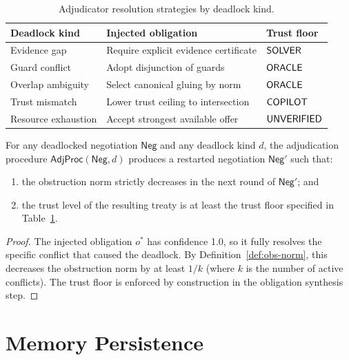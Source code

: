\documentclass[11pt]{article}
\newcommand{\Neg}{\mathsf{Neg}}           %
\newcommand{\AdjProc}{\mathsf{AdjProc}}   %
\begin{document}
\begin{table}[H]
\centering
\caption{Adjudicator resolution strategies by deadlock kind.}
\label{tab:adj-strategies}
\small
\begin{tabular}{ll l}
\toprule
\textbf{Deadlock kind} & \textbf{Injected obligation} & \textbf{Trust floor} \\
\midrule
Evidence gap       & Require explicit evidence certificate  & $\mathsf{SOLVER}$ \\
Guard conflict     & Adopt disjunction of guards           & $\mathsf{ORACLE}$  \\
Overlap ambiguity  & Select canonical gluing by norm       & $\mathsf{ORACLE}$  \\
Trust mismatch     & Lower trust ceiling to intersection   & $\mathsf{COPILOT}$ \\
Resource exhaustion & Accept strongest available offer     & $\mathsf{UNVERIFIED}$   \\
\bottomrule
\end{tabular}
\end{table}

\begin{theorem}\label{thm:adj-progress}
For any deadlocked negotiation $\Neg$ and any deadlock kind $d$,
the adjudication procedure $\AdjProc(\Neg, d)$ produces a restarted
negotiation $\Neg'$ such that:
\begin{enumerate}[noitemsep,label=(\alph*)]
  \item the obstruction norm strictly decreases in the next round
    of $\Neg'$; and
  \item the trust level of the resulting treaty is at least the
    trust floor specified in Table~\ref{tab:adj-strategies}.
\end{enumerate}
\end{theorem}

\begin{proof}
The injected obligation $o^*$ has confidence 1.0, so it fully
resolves the specific conflict that caused the deadlock.
By Definition~\ref{def:obs-norm}, this decreases the obstruction norm
by at least $1/k$ (where $k$ is the number of active conflicts).
The trust floor is enforced by construction in the obligation
synthesis step.
\end{proof}

\section{Memory Persistence}\label{sec:memory}
\end{document}
